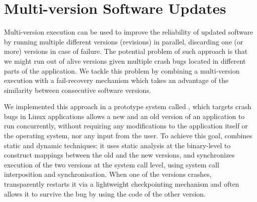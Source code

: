 \chapter{Multi-version Software Updates}
\label{chap:safe-updates}



Multi-version execution can be used to improve the reliability of updated
software by running multiple different versions (revisions) in parallel,
discarding one (or more) versions in case of failure. The potential problem
of such approach is that we might run out of alive versions given multiple
crash bugs located in different parts of the application. We tackle this
problem by combining a multi-version execution with a fail-recovery mechanism
which takes an advantage of the similarity between consecutive software
versions.


We implemented this approach in a prototype system called \mx, which
targets crash bugs in Linux applications
\mx allows a new and an old version of an application to
run concurrently, without requiring any
modifications to the application itself or the operating system, nor any
input from the user. To achieve this goal, \mx combines static and
dynamic techniques: it uses static analysis at the binary-level to
construct mappings between the old and the new versions, and synchronizes
execution of the two versions at the system call level, using system call
interposition and synchronisation.  When one of the versions crashes, \mx
transparently restarts it via a lightweight checkpointing mechanism and often
allows it to survive the bug by using the code of the other version.

